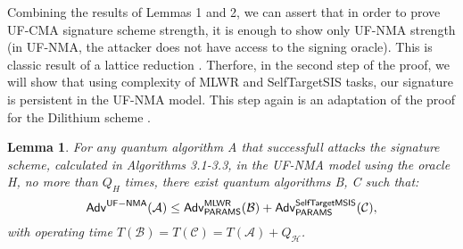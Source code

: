 \documentclass{article}
\theoremstyle{plain}
\newtheorem{lemma}[theorem]{Lemma}
\theoremstyle{definition}
\def\nf{\normalfont}
\begin{document}
    Combining the results of Lemmas 1 and 2, we can assert that in order to prove UF-CMA signature scheme strength, it is enough to show only UF-NMA strength (in UF-NMA, the attacker does not have access to the signing oracle). This is  classic result of a lattice reduction \cite{KLS18}. Therfore, in the second step of the proof, we will show that using complexity of MLWR and SelfTargetSIS tasks, our signature is persistent in the UF-NMA model. This step again is an adaptation of the proof for the Dilithium scheme \cite[Lemma 4.10]{KLS18}.

    \begin{lemma}
    For any quantum algorithm A that successfull attacks the signature scheme, calculated in Algorithms 3.1-3.3, in the UF-NMA model using the oracle H, no more than $Q_H$ times, there exist quantum algorithms B, C such that:
    $$
        \mathsf{\nf{Adv}}^{\mathsf{\nf{UF-NMA}}}(\mathcal{A}) \leq
        \mathsf{\nf{Adv}}^{\mathsf{\nf{MLWR}}}_\mathsf{\nf{PARAMS}}(\mathcal{B}) +
        \mathsf{\nf{Adv}}^{\mathsf{\nf{SelfTargetMSIS}}}_\mathsf{\nf{PARAMS}}(\mathcal{C}),
    $$
    with operating time $T(\mathcal{B}) = T(\mathcal{C}) = T(\mathcal{A}) + Q_\mathcal{H}$.
    \end{lemma}
\end{document}

